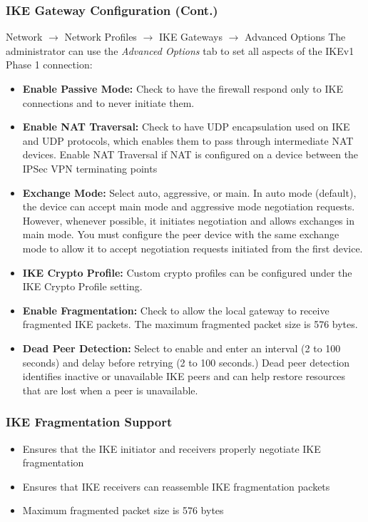 \subsubsection{IKE Gateway Configuration (Cont.)}
Network $\rightarrow$ Network Profiles $\rightarrow$ IKE Gateways $\rightarrow$ Advanced Options
\newline
The administrator can use the \textit{Advanced Options} tab to set all aspects of the IKEv1 Phase 1 connection:
\begin{itemize}
    \item \textbf{Enable Passive Mode:} Check to have the firewall respond only to IKE connections and to never initiate them.
    \item \textbf{Enable NAT Traversal:} Check to have UDP encapsulation used on IKE and UDP protocols, which enables them to pass through intermediate NAT devices.
    Enable NAT Traversal if NAT is configured on a device between the IPSec VPN terminating points
    \item \textbf{Exchange Mode:} Select auto, aggressive, or main. In auto mode (default), the device can accept main mode and aggressive mode negotiation requests.
    However, whenever possible, it initiates negotiation and allows exchanges in main mode. You must configure the peer device with the same exchange mode to allow it to accept negotiation requests initiated from the first device.
    \item \textbf{IKE Crypto Profile:} Custom crypto profiles can be configured under the IKE Crypto Profile setting.
    \item \textbf{Enable Fragmentation:} Check to allow the local gateway to receive fragmented IKE packets.
    The maximum fragmented packet size is 576 bytes.
    \item \textbf{Dead Peer Detection:} Select to enable and enter an interval (2 to 100 seconds) and delay before retrying (2 to 100 seconds.)
    Dead peer detection identifies inactive or unavailable IKE peers and can help restore resources that are lost when a peer is unavailable.
\end{itemize}

\subsubsection{IKE Fragmentation Support}
\begin{itemize}
    \item Ensures that the IKE initiator and receivers properly negotiate IKE fragmentation
    \item Ensures that IKE receivers can reassemble IKE fragmentation packets
    \item Maximum fragmented packet size is 576 bytes
\end{itemize}

